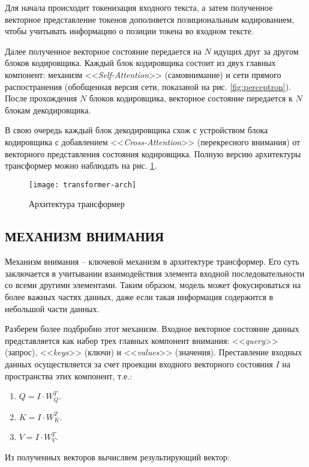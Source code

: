 Для начала происходит токенизация входного текста, а затем полученное векторное представление токенов дополняется позициональным кодированием, чтобы учитывать информацию о позиции токена во входном тексте.

Далее полученное векторное состояние передается на $N$ идущих друг за другом блоков кодировщика. Каждый блок кодировщика состоит из двух главных компонент: механизм <<\textit{Self-Attention}>> (самовнимание) и сети прямого распостранения (обобщенная версия сети, показаной на рис. \ref{fig:perceptron}). После прохождения $N$ блоков кодировщика, векторное состояние передается к $N$ блокам декодировщика.

В свою очередь каждый блок декодировщика схож с устройством блока кодировщика с добавлением <<\textit{Cross-Attention}>> (перекресного внимания) от векторного представления состояния кодировщика. Полную версию архитектуры трансформер можно наблюдать на рис. \ref{fig:transformer-arch}.
\begin{figure}[H]
    \centering
    \texttt{[image: transformer-arch]}
    \caption{Архитектура трансформер}
    \label{fig:transformer-arch}
\end{figure}
\subsection{МЕХАНИЗМ ВНИМАНИЯ}
Механизм внимания -- ключевой механизм в архитектуре трансформер. Его суть заключается в учитывании взаимодействия элемента входной последовательности со всеми другими элементами. Таким образом, модель может фокусироваться на более важных частях данных, даже если такая информация содержится в небольшой части данных.

Разберем более подбробно этот механизм. Входное векторное состояние данных представляется как набор трех главных компонент внимания: <<\textit{query}>> (запрос), <<\textit{keys}>> (ключи) и <<\textit{values}>> (значения). Преставление входных данных осуществляется за счет проекции входного векторного состояния $I$ на пространства этих компонент, т.е.:

\begin{enumerate}
    \item $Q = I \cdot W_Q^T$.
    \item $K = I \cdot W_K^T$.
    \item $V = I \cdot W_V^T$.
\end{enumerate}

Из полученных векторов вычисляем результирующий вектор:

